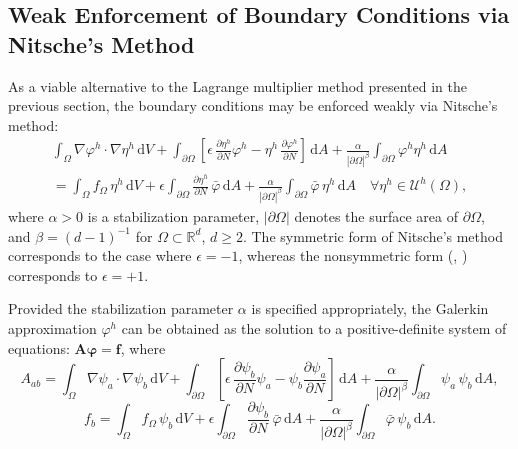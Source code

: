 	\subsection*{Weak Enforcement of Boundary Conditions via Nitsche's Method}
	
	As a viable alternative to the Lagrange multiplier method presented in the previous section, the boundary conditions may be enforced weakly via Nitsche's method:
	\begin{eqnarray}
		\int_{\Omega} \nabla \varphi^h \cdot \nabla \eta^h \, \mathrm dV + \int_{\partial \Omega} \left[ \epsilon \, \frac{\partial \eta^h}{\partial N} \varphi^h - \eta^h \, \frac{\partial \varphi^h}{\partial N} \right] \, \mathrm dA + \frac{\alpha}{|\partial \Omega|^{\beta}} \int_{\partial \Omega} \varphi^h \eta^h \, \mathrm dA \nonumber \\ = \int_\Omega f_\Omega \, \eta^h \, \mathrm dV + \epsilon \int_{\partial \Omega} \frac{\partial \eta^h}{\partial N} \, \bar{\varphi} \, \mathrm dA + \frac{\alpha}{|\partial \Omega|^{\beta}} \int_{\partial \Omega} \bar{\varphi} \, \eta^h \, \mathrm dA \quad \forall \eta^h \in \mathcal{U}^h (\Omega),
		\label{eq:vetfem}
	\end{eqnarray}
	where $\alpha > 0$ is a stabilization parameter, $| \partial \Omega |$ denotes the surface area of $\partial \Omega$, and $\beta = (d-1)^{-1}$ for $\Omega \subset \mathbb{R}^d$, $d \geq 2$. The symmetric form of Nitsche's method \cite{Juntunen&Stenberg:09} corresponds to the case where $\epsilon = -1$, whereas the nonsymmetric form (\cite{Freund:95}, \cite{Burman:12}) corresponds to $\epsilon = +1$.
	
	Provided the stabilization parameter $\alpha$ is specified appropriately, the Galerkin approximation $\varphi^h$ can be obtained as the solution to a positive-definite system of equations: $\bm{A} \boldsymbol{\varphi} = \bm{f}$, where
	\begin{equation}
		A_{ab} = \int_{\Omega} \nabla \psi_a \cdot \nabla \psi_b \, \mathrm dV + \int_{\partial \Omega} \left[ \epsilon \, \frac{\partial \psi_b}{\partial N} \psi_a - \psi_b \frac{\partial \psi_a}{\partial N} \right] \, \mathrm dA + \frac{\alpha}{|\partial \Omega|^{\beta}} \int_{\partial \Omega} \psi_a \, \psi_b \, \mathrm dA,
	\end{equation}
	\begin{equation}
		f_{b} = \int_{\Omega} f_\Omega \, \psi_b \, \mathrm dV + \epsilon \int_{\partial \Omega} \frac{\partial \psi_b}{\partial N} \, \bar{\varphi} \, \mathrm dA + \frac{\alpha}{|\partial \Omega|^{\beta}} \int_{\partial \Omega} \bar{\varphi} \, \psi_b \, \mathrm dA.
	\end{equation}
	
